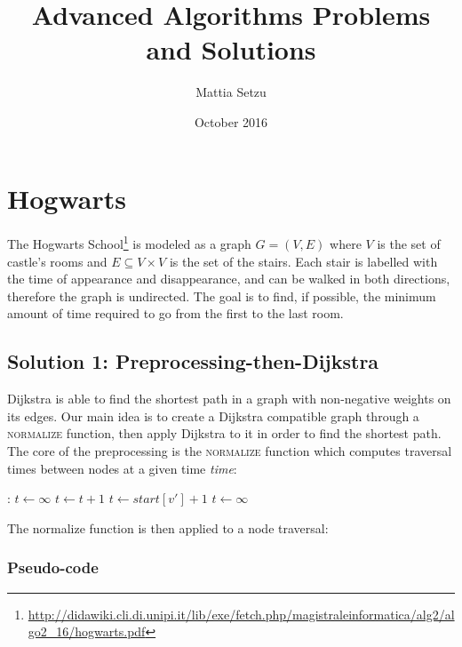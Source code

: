 \documentclass{article}
\title{Advanced Algorithms Problems and Solutions}
\author{Mattia Setzu}
\date{October 2016}
\begin{document}
\maketitle

\tableofcontents
\clearpage

\section{Hogwarts}

The Hogwarts School\footnote{\url{http://didawiki.cli.di.unipi.it/lib/exe/fetch.php/magistraleinformatica/alg2/algo2_16/hogwarts.pdf}}
is modeled as a graph $G=(V, E)$ where $V$ is the set of castle's rooms and $E \subseteq V \times V$
is the set of the stairs.
Each stair is labelled with the time of appearance and disappearance, and can be
walked in both directions, therefore the graph is undirected.
The goal is to find, if possible, the minimum amount of time required to go from
the first to the last room.

\subsection{Solution 1: Preprocessing-then-Dijkstra}

Dijkstra is able to find the shortest path in a graph with non-negative weights
on its edges.
Our main idea is to create a Dijkstra compatible graph through a \textsc{normalize}
function, then apply Dijkstra to it in order to find the shortest path.
The core of the preprocessing is the \textsc{normalize} function which computes traversal
times between nodes at a given time \emph{time}:

\begin{algorithmic}[1]
  :
    \State $t \gets \infty$
      
      \State $t \gets t + 1$
                
      \State $t \gets start[v'] + 1$
    \Else
      \State $t \gets \infty$          
    \EndIf
      \State {}
    \EndFunction
\end{algorithmic}

The normalize function is then applied to a node traversal:

\subsubsection{Pseudo-code}
\end{document}

